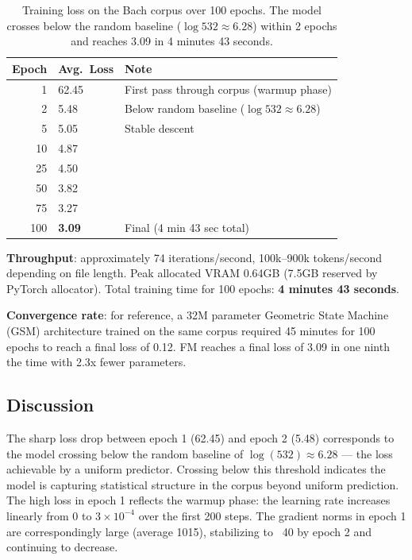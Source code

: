 \documentclass[11pt]{article}
\begin{document}
\begin{table}[h]
\centering
\begin{tabular}{@{}rll@{}}
\toprule
Epoch & Avg.\ Loss & Note \\
\midrule
1  & 62.45 & First pass through corpus (warmup phase) \\
2  & 5.48  & Below random baseline ($\log 532 \approx 6.28$) \\
5  & 5.05  & Stable descent \\
10 & 4.87  & \\
25 & 4.50  & \\
50 & 3.82  & \\
75 & 3.27  & \\
100 & \textbf{3.09} & Final (4 min 43 sec total) \\
\bottomrule
\end{tabular}
\caption{Training loss on the Bach corpus over 100 epochs. The model crosses below the random baseline ($\log 532 \approx 6.28$) within 2 epochs and reaches 3.09 in 4 minutes 43 seconds.}
\end{table}

\textbf{Throughput}: approximately 74 iterations/second, 100k--900k tokens/second depending on file length. Peak allocated VRAM 0.64GB (7.5GB reserved by PyTorch allocator). Total training time for 100 epochs: \textbf{4 minutes 43 seconds}.

\textbf{Convergence rate}: for reference, a 32M parameter Geometric State Machine (GSM) architecture \cite{gsm2026} trained on the same corpus required 45 minutes for 100 epochs to reach a final loss of 0.12. FM reaches a final loss of 3.09 in one ninth the time with 2.3x fewer parameters.

\subsection{Discussion}

The sharp loss drop between epoch 1 (62.45) and epoch 2 (5.48) corresponds to the model crossing below the random baseline of $\log(532) \approx 6.28$ — the loss achievable by a uniform predictor. Crossing below this threshold indicates the model is capturing statistical structure in the corpus beyond uniform prediction. The high loss in epoch 1 reflects the warmup phase: the learning rate increases linearly from 0 to $3 \times 10^{-4}$ over the first 200 steps. The gradient norms in epoch 1 are correspondingly large (average 1015), stabilizing to ~40 by epoch 2 and continuing to decrease.
\end{document}
